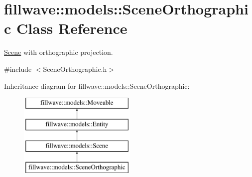\hypertarget{classfillwave_1_1models_1_1SceneOrthographic}{}\section{fillwave\+:\+:models\+:\+:Scene\+Orthographic Class Reference}
\label{classfillwave_1_1models_1_1SceneOrthographic}


\hyperlink{classfillwave_1_1models_1_1Scene}{Scene} with orthographic projection.  




{\ttfamily \#include $<$Scene\+Orthographic.\+h$>$}

Inheritance diagram for fillwave\+:\+:models\+:\+:Scene\+Orthographic\+:\begin{figure}[H]
\begin{center}
\leavevmode
\includegraphics[height=4.000000cm]{classfillwave_1_1models_1_1SceneOrthographic}
\end{center}
\end{figure}

